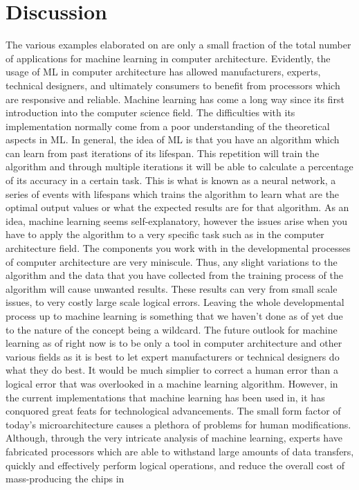 \documentclass[conference]{IEEEtran}
\begin{document}
\section{Discussion}
The various examples elaborated on are only a small fraction of the total number of applications for machine learning in computer architecture. Evidently, the usage of ML in computer 
architecture has allowed manufacturers, experts, technical designers, and ultimately consumers to benefit from processors which are responsive and reliable. Machine learning has come a 
long way since its first introduction into the computer science field. The difficulties with its implementation normally come from a poor understanding of the theoretical aspects in ML. 
In general, the idea of ML is that you have an algorithm which can learn from past iterations of its lifespan. This repetition will train the algorithm and through multiple iterations 
it will be able to calculate a percentage of its accuracy in a certain task. This is what is known as a neural network, a series of events with lifespans which trains the algorithm to 
learn what are the optimal output values or what the expected results are for that algorithm. As an idea, machine learning seems self-explanatory, however the issues arise when you have 
to apply the algorithm to a very specific task such as in the computer architecture field. The components you work with in the developmental processes of computer architecture are very 
miniscule. Thus, any slight variations to the algorithm and the data that you have collected from the training process of the algorithm will cause unwanted results. These results can 
very from small scale issues, to very costly large scale logical errors. Leaving the whole developmental process up to machine learning is something that we haven't done as of yet due 
to the nature of the concept being a wildcard. The future outlook for machine learning as of right now is to be only a tool in computer architecture and other various fields as it is 
best to let expert manufacturers or technical designers do what they do best. It would be much simplier to correct a human error than a logical error that was overlooked in a machine 
learning algorithm. However, in the current implementations that machine learning has been used in, it has conquored great feats for technological advancements. The small form factor 
of today's microarchitecture causes a plethora of problems for human modifications. Although, through the very intricate analysis of machine learning, experts have fabricated 
processors which are able to withstand large amounts of data transfers, quickly and effectively perform logical operations, and reduce the overall cost of mass-producing the chips in 
\end{document}
